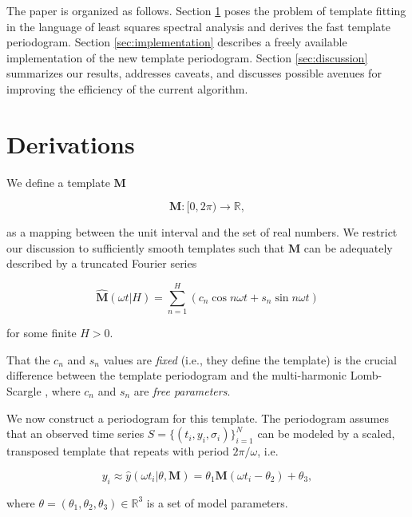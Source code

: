 \documentclass[apj]{emulateapj}
\begin{document}
The paper is organized as follows. Section \ref{sec:derivations} poses the problem of template
fitting in the language of least squares spectral analysis and derives the fast template
periodogram. Section \ref{sec:implementation} describes a freely available implementation
of the new template periodogram. Section \ref{sec:discussion} summarizes our results,
addresses caveats, and discusses possible avenues for improving the efficiency of the current
algorithm.


\section{Derivations}\label{sec:derivations}

We define a template $\mathbf{M}$

\begin{equation}
    \mathbf{M} : [0, 2\pi)\rightarrow\mathbb{R},
\end{equation}

\noindent as a mapping between the unit interval and the set of real numbers. We
restrict our discussion to sufficiently smooth templates such that
$\mathbf{M}$ can be adequately described by a truncated Fourier series

\begin{equation}
    \hat{\mathbf{M}}(\omega t|H) = \sum_{n=1}^H\left(c_n\cos{n\omega t} + s_n\sin{n\omega t}\right)
\end{equation}

\noindent for some finite $H > 0$.

That the $c_n$ and $s_n$ values are \emph{fixed} (i.e., they define
the template) is the crucial difference between the template periodogram and
the multi-harmonic Lomb-Scargle \citep{Palmer_2009,Bretthorst+Chi-Cheng_1988}, where $c_n$ and $s_n$
are \emph{free parameters}.

We now construct a periodogram for this template. The periodogram assumes
that an observed time series $S = \{(t_i, y_i, \sigma_i)\}_{i=1}^N$ can be modeled
by a scaled, transposed template that repeats with period $2\pi / \omega$, i.e.

\begin{equation}
y_i \approx \hat{y}(\omega t_i|\theta, \mathbf{M}) = \theta_1\mathbf{M}(\omega t_i - \theta_2) + \theta_3,
\end{equation}

\noindent where $\theta = (\theta_1, \theta_2, \theta_3)\in \mathbb{R}^3$ is a set of model parameters.
\end{document}
